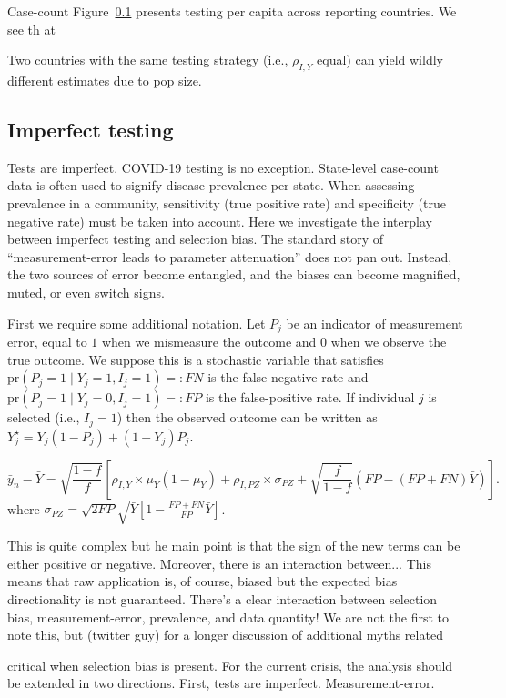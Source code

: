 \documentclass[12pt]{article}
\numberwithin{equation}{section}
\theoremstyle{plain}
\def\pr{\text{pr}}
\begin{document}
Case-count
Figure~\ref{} presents testing per capita across reporting countries.  We see th at

Two countries with the same testing strategy (i.e., $\rho_{I,Y}$ equal) can yield wildly different estimates due to pop size.

\subsection{Imperfect testing}

Tests are imperfect.  COVID-19 testing is no exception.  State-level case-count data is often used to signify disease prevalence per state.  When assessing prevalence in a community, sensitivity (true positive rate) and specificity (true negative rate) must be taken into account.  Here we investigate the interplay between imperfect testing and selection bias.  The standard story of ``measurement-error leads to parameter attenuation'' does not pan out.  Instead, the two sources of error become entangled, and the biases can become magnified, muted, or even switch signs.

First we require some additional notation.  Let $P_j$ be an indicator of measurement error, equal to $1$ when we mismeasure the outcome and $0$ when we observe the true outcome. We suppose this is a stochastic variable that satisfies $\pr(P_j = 1 \mid Y_j = 1, I_j = 1) =: FN$ is the false-negative rate and $\pr(P_j = 1 \mid Y_j = 0, I_j = 1) =: FP$ is the false-positive rate.  If individual $j$ is selected (i.e., $I_j = 1$) then the observed outcome can be written as $Y_j^\star = Y_j(1-P_j) + (1-Y_j) P_j$.

$$
\bar y_n - \bar Y = \sqrt{\frac{1-f}{f}} \left[ \rho_{I,Y} \times \mu_Y (1-\mu_Y) + \rho_{I,PZ} \times \sigma_{PZ} + \sqrt{\frac{f}{1-f}}  \left( FP - (FP+FN) \bar Y \right) \right] .
$$
where $\sigma_{PZ} = \sqrt{2 FP} \sqrt{\bar Y \left[ 1 - \frac{FP+FN}{FP} \bar Y \right]}$.

This is quite complex but he main point is that the sign of the new terms can be either positive or negative.  Moreover, there is an interaction between...
This means that raw application is, of course, biased but the expected bias directionality is not guaranteed.  There's a clear interaction between selection bias, measurement-error, prevalence, and data quantity!
We are not the first to note this, but  (twitter guy) for a longer discussion of additional myths related

 critical when selection bias is present.  For the current crisis, the analysis should be extended in two directions.  First, tests are imperfect. Measurement-error.
\end{document}
